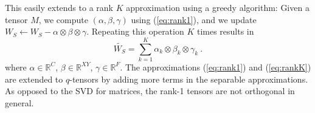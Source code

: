 This easily extends to a rank $K$ approximation using a greedy algorithm: Given a 
tensor $M$, we compute $(\alpha, \beta, \gamma)$ using (\ref{eq:rank1}), and we update 
$W_S \leftarrow W_S - \alpha \otimes \beta \otimes \gamma$. Repeating this operation $K$
times results in 
\begin{equation}
\label{eq:rankK}
	\tilde{W_S} = \sum_{k = 1}^{K} \alpha_k \otimes \beta_k \otimes \gamma_k ~.
\end{equation} 
where $\alpha \in \mathbb{R}^C$, $\beta \in \mathbb{R}^{XY}$, $\gamma \in \mathbb{R}^F$. 
The approximations (\ref{eq:rank1}) and (\ref{eq:rankK}) are extended to $q$-tensors 
by adding more terms in the separable approximations.
As opposed to the SVD for matrices, the rank-1 tensors are not orthogonal in general. 


%

